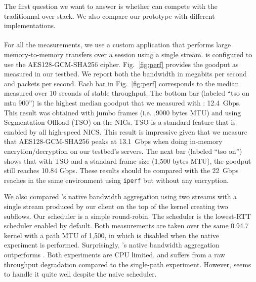 The first question we want to answer is whether \tcpls can compete with the
traditionnal \tls over \tcp stack. We also compare our \tcpls prototype with
different \quic implementations.

\paragraph*{\tcpls}
For all the \tcpls measurements, we use a custom application that performs
large memory-to-memory transfers over a \tcpls session using a single stream.
\tcpls is configured to use the AES128-GCM-SHA256 cipher. Fig.~\ref{fig:perf} provides the goodput as measured in our testbed. We report both the bandwidth in megabits per second and packets per second. Each bar in Fig.~\ref{fig:perf} corresponds to the median measured over 10 seconds of stable throughput. The bottom bar (labeled ``\tcpls tso on mtu 900'') is the highest median goodput that we measured with \tcpls: 12.4~Gbps. This result was obtained with jumbo frames (i.e. ,9000 bytes MTU) and using \tcp Segmentation Offload (TSO) on the NICs. TSO is a standard feature that is enabled by all high-speed NICS. This result is impressive given that we measure that AES128-GCM-SHA256 peaks at 13.1~Gbps when doing in-memory encrytion/decryption on our testbed's servers.
The next bar (labeled ``\tcpls tso on'') shows that with TSO and a standard frame size (1,500 bytes MTU), the goodput still reaches 10.84 Gbps. These
results should be compared with the 22~Gbps \tcp reaches in the same
environment using \texttt{iperf} but without any encryption.


We also compared \tcpls's native bandwidth aggregation using two streams with a single stream produced by our \tcpls client on the top of the \mptcp kernel creating two \mptcp subflows. Our \tcpls scheduler is a simple round-robin. The \mptcp scheduler is the lowest-RTT scheduler enabled by default. Both measurements are taken over the same 0.94.7 \mptcp kernel with a path MTU of 1,500, in which \mptcp is disabled when the \tcpls native experiment is performed.  Surprisingly, \tcpls's native bandwidth aggregation outperforms \mptcp. Both experiments are CPU limited, and suffers from a raw throughput degradation compared to the single-path experiment.  However, \tcpls seems to handle it quite well despite the naive scheduler.

